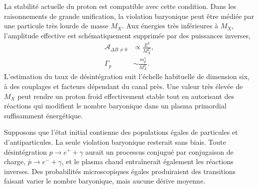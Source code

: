 La stabilité actuelle du proton est compatible avec cette condition. Dans les raisonnements de grande unification, la violation baryonique peut être médiée par une particule très lourde de masse \(M_X\). Aux énergies très inférieures à \(M_X\), l’amplitude effective est schématiquement supprimée par des puissances inverses,
\begin{equation}
\begin{aligned}
\mathcal A_{\Delta B\ne0}&\propto \frac{E^2}{M_X^2},\\
\Gamma_p&\sim \frac{m_p^5}{M_X^4}.
\end{aligned}
\label{eq:c08-heavy-suppression}
\end{equation}
L’estimation du taux de désintégration suit l’échelle habituelle de dimension six, à des couplages et facteurs dépendant du canal près. Une valeur très élevée de \(M_X\) peut rendre un proton froid effectivement stable tout en autorisant des réactions qui modifient le nombre baryonique dans un plasma primordial suffisamment énergétique.

\begin{classroomqa}
\end{classroomqa}

Supposons que l’état initial contienne des populations égales de particules et d’antiparticules. La seule violation baryonique resterait sans biais. Toute désintégration \(p\to e^++\gamma\) aurait un processus conjugué par conjugaison de charge, \(\bar p\to e^-+\gamma\), et le plasma chaud entraînerait également les réactions inverses. Des probabilités microscopiques égales produiraient des transitions faisant varier le nombre baryonique, mais aucune dérive moyenne.

\begin{classroomqa}
\end{classroomqa}

